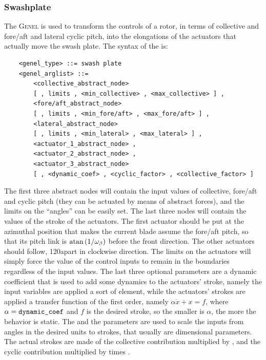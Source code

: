 \subsubsection{Swashplate}
\label{sec:EL:GENEL:SWASHPLATE}
The  \textsc{Genel} is used to transform the controls 
of a rotor, in terms of collective and fore/aft and lateral cyclic pitch, 
into the elongations of the actuators that actually move the swash plate.
The syntax of the  is:
\begin{verbatim}
    <genel_type> ::= swash plate
    <genel_arglist> ::=
        <collective_abstract_node> 
        [ , limits , <min_collective> , <max_collective> ] ,
        <fore/aft_abstract_node> 
        [ , limits , <min_fore/aft> , <max_fore/aft> ] ,
        <lateral_abstract_node> 
        [ , limits , <min_lateral> , <max_lateral> ] ,
        <actuator_1_abstract_node> ,
        <actuator_2_abstract_node> ,
        <actuator_3_abstract_node> 
        [ , <dynamic_coef> , <cyclic_factor> , <collective_factor> ]
\end{verbatim}
The first three abstract nodes will contain the input values 
of collective, fore/aft and cyclic pitch
(they can be actuated by means of abstract forces),
and the limits on the ``angles'' can be easily set. 
The last three nodes will contain the values of the stroke of the actuators.
The first actuator should be put at the azimuthal position 
that makes the current blade assume the fore/aft pitch,
so that its pitch link is $\mathrm{atan}\left( 1/\omega_{\beta} \right)$
before the front direction.
The other actuators should follow, 120\degr apart in clockwise direction.
The limits on the actuators will simply force the value of the control
inputs to remain in the boundaries regardless of the input values.
The last three optional parameters are a dynamic coefficient that is used to
add some dynamics to the actuators' stroke, namely the input variables are
applied a sort of   element, while the
actuators' strokes are applied a transfer function of the first order, namely
$ \alpha\dot{x}+x=f $, where $ \alpha=\texttt{dynamic\_coef} $ and $ f $ is
the desired stroke, so the smaller is $ \alpha $, the more the behavior is
static.
The  and the  parameters are
used to scale the inputs from angles in the desired units to strokes, that
usually are dimensional parameters. The actual strokes are made of the
collective contribution multiplied by , and the
cyclic contribution multiplied by  times 
.

